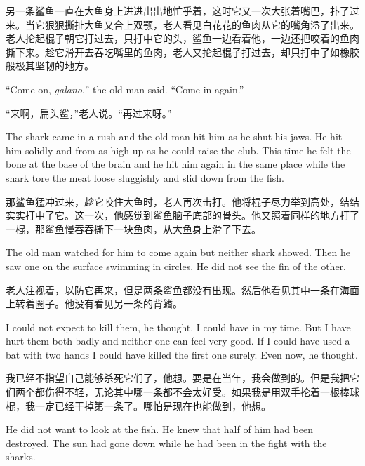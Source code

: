\begin{paracol}{2}
\switchcolumn

另一条鲨鱼一直在大鱼身上进进出出地忙乎着，这时它又一次大张着嘴巴，扑了过来。当它狠狠撕扯大鱼又合上双颚，老人看见白花花的鱼肉从它的嘴角溢了出来。老人抡起棍子朝它打过去，只打中它的头，鲨鱼一边看着他，一边还把咬着的鱼肉撕下来。趁它滑开去吞吃嘴里的鱼肉，老人又抡起棍子打过去，却只打中了如橡胶般极其坚韧的地方。

\switchcolumn*

``Come on, \emph{galano},'' the old man said. ``Come in again.''

\switchcolumn

“来啊，扁头鲨，”老人说。“再过来呀。”

\switchcolumn*

The shark came in a rush and the old man hit him as he shut his jaws. He hit
him solidly and from as high up as he could raise the club. This time he
felt the bone at the base of the brain and he hit him again in the same
place while the shark tore the meat loose \gls{sluggishly} and slid down from the
fish.

\switchcolumn

那鲨鱼猛冲过来，趁它咬住大鱼时，老人再次击打。他将棍子尽力举到高处，结结实实打中了它。这一次，他感觉到鲨鱼脑子底部的骨头。他又照着同样的地方打了一棍，那鲨鱼慢吞吞撕下一块鱼肉，从大鱼身上滑了下去。

\switchcolumn*

The old man watched for him to come again but neither shark showed. Then he
saw one on the surface swimming in circles. He did not see the fin of the
other.

\switchcolumn

老人注视着，以防它再来，但是两条鲨鱼都没有出现。然后他看见其中一条在海面上转着圈子。他没有看见另一条的背鳍。

\switchcolumn*

I could not expect to kill them, he thought. I could have in my time. But I
have hurt them both badly and neither one can feel very good. If I could
have used a bat with two hands I could have killed the first one surely.
Even now, he thought.

\switchcolumn

我已经不指望自己能够杀死它们了，他想。要是在当年，我会做到的。但是我把它们两个都伤得不轻，无论其中哪一条都不会太好受。如果我是用双手抡着一根棒球棍，我一定已经干掉第一条了。哪怕是现在也能做到，他想。

\switchcolumn*

He did not want to look at the fish. He knew that half of him had been
destroyed. The sun had gone down while he had been in the fight with the
sharks.


\end{paracol}
